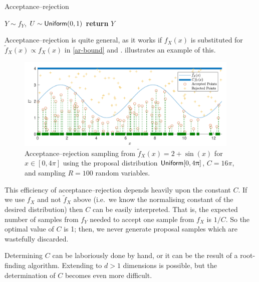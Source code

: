 \begin{algorithm}[H]
\caption{Acceptance--rejection}
\label{alg:ar}
\begin{algorithmic}[1]
\State $Y \sim f_Y$, $U \sim \mathsf{Uniform}(0,1)$
\State \textbf{return} $Y$
\EndIf
\EndWhile
\EndFunction
\end{algorithmic}
\end{algorithm}

Acceptance--rejection is quite general, as it works if $f_X(x)$ is substituted for $\tilde{f}_X(x) \propto f_X(x)$ in \eqref{ar-bound} and .  illustrates an example of this.

\begin{figure}[H]
\centering
\includegraphics[width=0.95\textwidth]{images/ar.pdf}
\caption{Acceptance--rejection sampling from $\tilde{f}_X(x) = 2 + \sin(x)$ for $x \in [0, 4\pi]$ using the proposal distribution $\mathsf{Uniform}[0,4\uppi]$, $C=16\pi$, and sampling $R=100$ random variables.}
\label{fig:ar}
\end{figure}

This efficiency of acceptance--rejection depends heavily upon the constant $C$. If we use $f_X$ and not $\tilde{f}_X$ above (i.e.\ we know the normalising constant of the desired distribution) then $C$ can be easily interpreted. That is, the expected number of samples from $f_Y$ needed to accept one sample from $f_X$ is $1 / C$. So the optimal value of $C$ is 1; then, we never generate proposal samples which are wastefully discarded.

Determining $C$ can be laboriously done by hand, or it can be the result of a root-finding algorithm. Extending to $d>1$ dimensions is possible, but the determination of $C$ becomes even more difficult.


